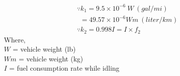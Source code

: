\begin{gather}
	\because k_1 = 9.5\times 10^{-6} \: W \: (gal/mi)\\
	\: \: = 49.57 \times 10^{-6} Wm \: (liter/km)\\
	\because k_2 = 0.998 I = I \times f_2
\end{gather}
Where,\\
\hspace*{10mm} $ W $ = vehicle weight (lb)\\
\hspace*{10mm} $ Wm $ = vehicle weight (kg)\\
\hspace*{10mm} $ I $ = fuel consumption rate while idling